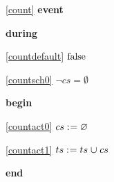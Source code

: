 \noindent \ref{count}  \textbf{event}
\begin{block}
  \item   \textbf{during}
  \begin{block}
  \item[ \eqref{countdefault} ]\sout{$\text{false}$} %
  \end{block}
  \begin{block}
  \item[ \eqref{countsch0} ]{$\neg cs = \emptyset $} %
  \end{block}
  \item   \textbf{begin}
  \begin{block}
  \item[ \eqref{countact0} ]{$cs \mathrel{:\mkern1mu=} \mathord\varnothing$} %
  \item[ \eqref{countact1} ]{$ts \mathrel{:\mkern1mu=} ts \mathbin{\mkern1mu\cup\mkern1mu} cs $} %
  \end{block}
  \item   \textbf{end} \\
\end{block}
